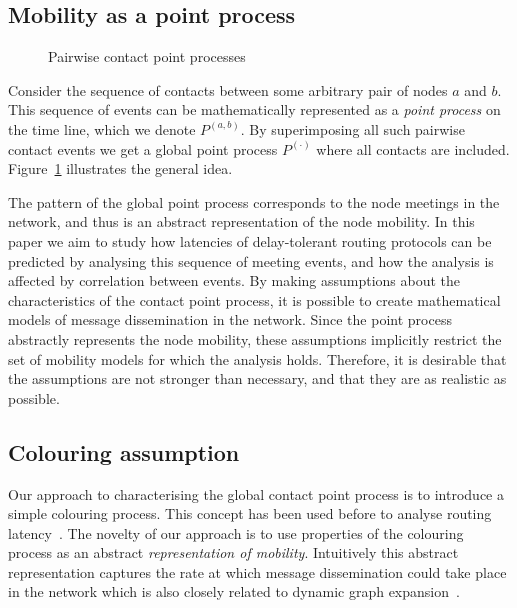 \documentclass{article}
\begin{document}
\subsection{Mobility as a point process}

\begin{figure}[t]
  \centering
   \caption{Pairwise contact point processes}
  \label{fig:multivariate}
\end{figure}

Consider the sequence of contacts between some arbitrary pair of nodes
$a$ and $b$. This sequence of events can be mathematically represented
as a \emph{point process} on the time line, which we denote
$P^{(a,b)}$. By superimposing all such pairwise contact events we get
a global point process $P^{(\cdot)}$ where all contacts are
included. Figure~\ref{fig:multivariate} illustrates the general idea.



The pattern of the global point process corresponds to the node
meetings in the network, and thus is an abstract representation of the
node mobility. In this paper we aim to study how latencies of
delay-tolerant routing protocols can be predicted by analysing this
sequence of meeting events, and how the analysis is affected by
correlation between events. By making assumptions about the
characteristics of the contact point process, it is possible to create
mathematical models of message dissemination in the network. Since the
point process abstractly represents the node mobility, these
assumptions implicitly restrict the set of mobility models for which
the analysis holds. Therefore, it is desirable that the assumptions
are not stronger than necessary, and that they are as realistic as
possible.
\subsection{Colouring assumption}
\label{sec:colouringassumption}
Our approach to characterising the global contact point process is to
introduce a simple colouring process. This concept has been used
before to analyse routing latency~\cite{resta11,spyropoulos08}. The
novelty of our approach is to use properties of the colouring process
as an abstract \emph{representation of mobility}. Intuitively this
abstract representation captures the rate at which message
dissemination could take place in the network which is also closely
related to dynamic graph expansion~\cite{asplund12worst}.
\end{document}
